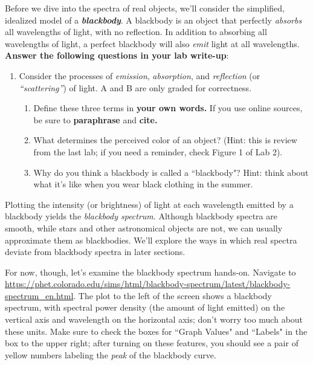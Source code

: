 \documentclass[11pt]{article}
\begin{document}
Before we dive into the spectra of real objects, we'll consider the simplified, idealized model of a \textbf{\emph{blackbody}}. A blackbody is an object that perfectly \emph{absorbs} all wavelengths of light, with no reflection. In addition to absorbing all wavelengths of light, a perfect blackbody will also \emph{emit} light at all wavelengths. \textbf{Answer the following questions in your lab write-up}:
\begin{enumerate}
    \item Consider the processes of \emph{emission}, \emph{absorption}, and \emph{reflection} (or \emph{``scattering''}) of light. A and B are only graded for correctness.
    \begin{enumerate}
        \item Define these three terms in \textbf{your own words.} If you use online sources, be sure to \textbf{paraphrase} and \textbf{cite.}

        \item What determines the perceived color of an object? (Hint: this is review from the last lab; if you need a reminder, check Figure 1 of Lab 2).

        \item Why do you think a blackbody is called a ``blackbody"? Hint: think about what it's like when you wear black clothing in the summer.
    \end{enumerate} 
    
\end{enumerate}

Plotting the intensity (or brightness) of light at each wavelength emitted by a blackbody yields the \emph{blackbody spectrum}. Although blackbody spectra are smooth, while stars and other astronomical objects are not, we can usually approximate them as blackbodies. We'll explore the ways in which real spectra deviate from blackbody spectra in later sections.

\newpage

For now, though, let's examine the blackbody spectrum hands-on. Navigate to \url{https://phet.colorado.edu/sims/html/blackbody-spectrum/latest/blackbody-spectrum_en.html}. The plot to the left of the screen shows a blackbody spectrum, with spectral power density (the amount of light emitted) on the vertical axis and wavelength on the horizontal axis; don't worry too much about these units. Make sure to check the boxes for ``Graph Values" and ``Labels" in the box to the upper right; after turning on these features, you should see a pair of yellow numbers labeling the \emph{peak} of the blackbody curve. 
\end{document}
